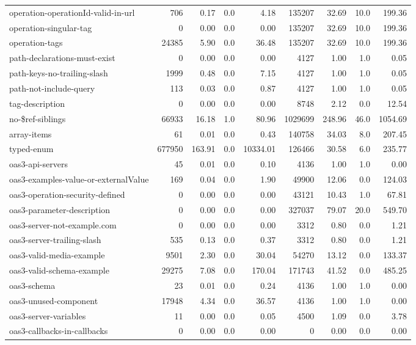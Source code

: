 {\begin{longtable}{lrrrrrrrr}
  operation-operationId-valid-in-url & 706 & 0.17 & 0.0 & 4.18 & 135207 & 32.69 & 10.0 & 199.36 \\
  operation-singular-tag & 0 & 0.00 & 0.0 & 0.00 & 135207 & 32.69 & 10.0 & 199.36 \\
  operation-tags & 24385 & 5.90 & 0.0 & 36.48 & 135207 & 32.69 & 10.0 & 199.36 \\
  path-declarations-must-exist & 0 & 0.00 & 0.0 & 0.00 & 4127 & 1.00 & 1.0 & 0.05 \\
  path-keys-no-trailing-slash & 1999 & 0.48 & 0.0 & 7.15 & 4127 & 1.00 & 1.0 & 0.05 \\
  path-not-include-query & 113 & 0.03 & 0.0 & 0.87 & 4127 & 1.00 & 1.0 & 0.05 \\
  tag-description & 0 & 0.00 & 0.0 & 0.00 & 8748 & 2.12 & 0.0 & 12.54 \\
  no-\$ref-siblings & 66933 & 16.18 & 1.0 & 80.96 & 1029699 & 248.96 & 46.0 & 1054.69 \\
  array-items & 61 & 0.01 & 0.0 & 0.43 & 140758 & 34.03 & 8.0 & 207.45 \\
  typed-enum & 677950 & 163.91 & 0.0 & 10334.01 & 126466 & 30.58 & 6.0 & 235.77 \\
  oas3-api-servers & 45 & 0.01 & 0.0 & 0.10 & 4136 & 1.00 & 1.0 & 0.00 \\
  oas3-examples-value-or-externalValue & 169 & 0.04 & 0.0 & 1.90 & 49900 & 12.06 & 0.0 & 124.03 \\
  oas3-operation-security-defined & 0 & 0.00 & 0.0 & 0.00 & 43121 & 10.43 & 1.0 & 67.81 \\
  oas3-parameter-description & 0 & 0.00 & 0.0 & 0.00 & 327037 & 79.07 & 20.0 & 549.70 \\
  oas3-server-not-example.com & 0 & 0.00 & 0.0 & 0.00 & 3312 & 0.80 & 0.0 & 1.21 \\
  oas3-server-trailing-slash & 535 & 0.13 & 0.0 & 0.37 & 3312 & 0.80 & 0.0 & 1.21 \\
  oas3-valid-media-example & 9501 & 2.30 & 0.0 & 30.04 & 54270 & 13.12 & 0.0 & 133.37 \\
  oas3-valid-schema-example & 29275 & 7.08 & 0.0 & 170.04 & 171743 & 41.52 & 0.0 & 485.25 \\
  oas3-schema & 23 & 0.01 & 0.0 & 0.24 & 4136 & 1.00 & 1.0 & 0.00 \\
  oas3-unused-component & 17948 & 4.34 & 0.0 & 36.57 & 4136 & 1.00 & 1.0 & 0.00 \\
  oas3-server-variables & 11 & 0.00 & 0.0 & 0.05 & 4500 & 1.09 & 0.0 & 3.78 \\
  oas3-callbacks-in-callbacks & 0 & 0.00 & 0.0 & 0.00 & 0 & 0.00 & 0.0 & 0.00 \\
  \hline\hline
\end{longtable}
}

